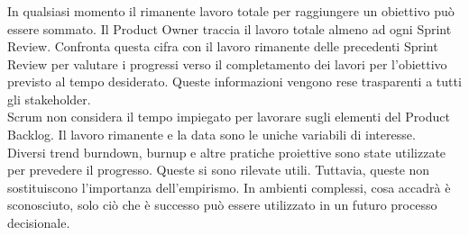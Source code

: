 \subsubsection*{\color{SteelBlue}{Monitorare i Progressi verso un Obiettivo}} %
\label{ssub:monitoring_progress_toward_a_great}
In qualsiasi momento il rimanente lavoro totale per raggiungere un obiettivo pu\`o essere sommato. Il 
Product Owner traccia il lavoro totale almeno ad ogni Sprint Review. Confronta questa cifra con il 
lavoro rimanente delle precedenti Sprint Review per valutare i progressi verso il completamento dei 
lavori per l'obiettivo previsto al tempo desiderato. Queste informazioni vengono rese trasparenti a 
tutti gli stakeholder.\newline
\\Scrum non considera il tempo impiegato per lavorare sugli elementi del Product Backlog. Il lavoro 
rimanente e la data sono le uniche  variabili di interesse. \newline
\\Diversi trend burndown, burnup e altre pratiche proiettive sono state utilizzate per prevedere il 
progresso. Queste si sono rilevate utili. Tuttavia, queste non sostituiscono l'importanza 
dell'empirismo. In ambienti complessi, cosa accadr\`a \`e sconosciuto, solo ci\`o che \`e successo pu\`o 
essere utilizzato in un futuro processo decisionale.


